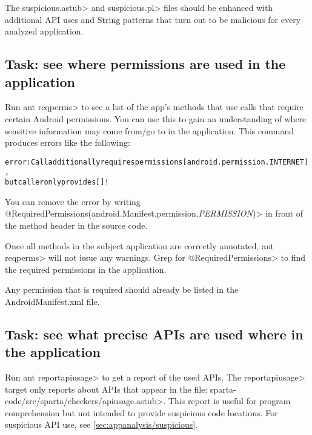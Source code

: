 The \<suspicious.astub> and \<suspicious.pl> files should be enhanced
with additional API uses and String patterns that turn out to be 
malicious for every analyzed application. 


\subsection{Task: see where permissions are used in the application}
\label{sec:appanalysis/reqperms}

Run \<ant reqperms>  to see a list of the app's methods
that use calls that require certain Android permissions. You can use
this to gain an understanding of where sensitive information may come
from/go to in the application. This command produces errors like the following:
\begin{alltt}
error: Call additionally requires permissions [android.permission.INTERNET], 
   but caller only provides []!
\end{alltt}
You can remove the error by writing
\<@RequiredPermissions({android.Manifest.permission.\emph{PERMISSION}})> in front of the method header in the source code.

Once all methods in the subject application are correctly annotated,
\<ant reqperms> will not issue any warnings.
Grep for \<@RequiredPermissions> to find the required permissions
in the application.

Any permission that is required should already be listed in the AndroidManifest.xml file. 





\subsection{Task: see what precise APIs are used where in the application}

Run \<ant reportapiusage> to get a report of the used APIs. The
\<reportapiusage> target only reports about APIs that appear in the file:
\<sparta-code/src/sparta/checkers/apiusage.astub>. This report is useful
for program comprehension but not intended to provide suspicious code
locations. For suspicious API use, see
\ref{sec:appanalysis/suspicious}.

